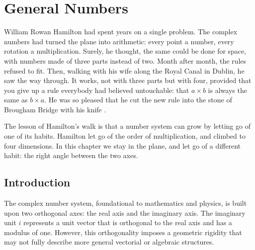 \providecommand{\Com}{\operatorname{Com}}
\providecommand{\Sh}{\operatorname{Sh}}
\chapter{General Numbers}\label{ch:general-numbers}



William Rowan Hamilton had spent years on a single problem. The complex numbers had turned the plane into arithmetic: every point a number, every rotation a multiplication. Surely, he thought, the same could be done for space, with numbers made of three parts instead of two. Month after month, the rules refused to fit. Then, walking with his wife along the Royal Canal in Dublin, he saw the way through. It works, not with three parts but with four, provided that you give up a rule everybody had believed untouchable: that $a \times b$ is always the same as $b \times a$. He was so pleased that he cut the new rule into the stone of Brougham Bridge with his knife \citep{Kline1972}.

The lesson of Hamilton's walk is that a number system can grow by letting go of one of its habits. Hamilton let go of the order of multiplication, and climbed to four dimensions. In this chapter we stay in the plane, and let go of a different habit: the right angle between the two axes.

\section{Introduction}\label{sec:gn-intro}

The complex number system, foundational to mathematics and physics, is built upon two orthogonal axes: the real axis and the imaginary axis. The imaginary unit $i$ represents a unit vector that is orthogonal to the real axis and has a modulus of one. However, this orthogonality imposes a geometric rigidity that may not fully describe more general vectorial or algebraic structures.

